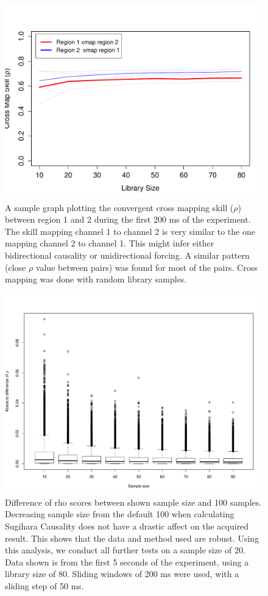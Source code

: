 \documentclass[journal,12pt,onecolumn,draftclsnofoot]{IEEEtran}  %
\begin{document}
\begin{figure}[!h]  \centering
  \includegraphics[width=0.95\linewidth]{figures/sample_pairwise_causality_measure.pdf}
  \caption{A sample graph plotting the convergent cross mapping skill ($\rho$) between region 1 and 2 during the first 200 ms of the experiment. The skill mapping channel 1 to channel 2 is very similar to the one mapping channel 2 to channel 1. This might infer either bidirectional causality or unidirectional forcing. A similar pattern (close $\rho$ value between pairs) was found for most of the pairs. Cross mapping was done with random library samples.}
  \label{fig:sample_pair_causality_plot}
\end{figure}



\begin{figure}[!h]
  \centering
  \includegraphics[width=0.95\linewidth]{figures/diff_in_sample_size.pdf}
  \caption{Difference of rho scores between shown sample size and 100 samples. Decreasing sample size from the default 100 when calculating Sugihara Causality does not have a drastic affect on the acquired result. This shows that the data and method used are robust. Using this analysis, we conduct all further tests on a sample size of 20. Data shown is from the first 5 seconds of the experiment, using a library size of 80. Sliding windows of 200 ms were used, with a sliding step of 50 ms.}
  \label{fig:sample_size_diff_box}
\end{figure}
\end{document}
